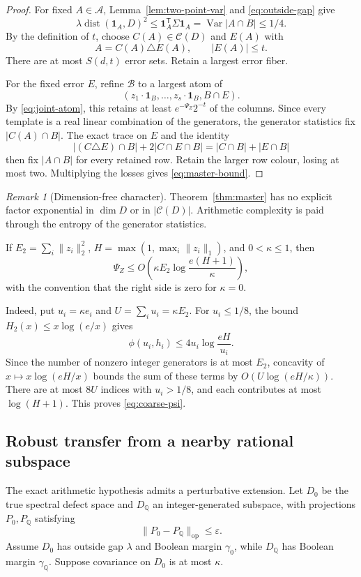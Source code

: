 \documentclass[11pt]{article}
\theoremstyle{definition}
\theoremstyle{remark}
\newtheorem{remark}[theorem]{Remark}
\newcommand{\cA}{\mathcal A}
\newcommand{\cB}{\mathcal B}
\newcommand{\cC}{\mathcal C}
\newcommand{\1}{\mathbf 1}
\newcommand{\Var}{\operatorname{Var}}
\newcommand{\dist}{\operatorname{dist}}
\begin{document}
\begin{proof}
For fixed $A\in\cA$, Lemma~\ref{lem:two-point-var} and
\eqref{eq:outside-gap} give
\[
 \lambda\dist(\1_A,D)^2
 \le\1_A^\mathsf T\Sigma\1_A
 =\Var|A\cap B|
 \le1/4.
\]
By the definition of $t$, choose $C(A)\in\cC(D)$ and $E(A)$ with
\[
 A=C(A)\triangle E(A),
 \qquad |E(A)|\le t.
\]
There are at most $S(d,t)$ error sets.  Retain a largest error fiber.

For the fixed error $E$, refine $\cB$ to a largest atom of
\[
 (z_1\cdot\1_B,\ldots,z_s\cdot\1_B, B\cap E).
\]
By \eqref{eq:joint-atom}, this retains at least
$e^{-\Psi_Z}2^{-t}$ of the columns.  Since every template is a real linear
combination of the generators, the generator statistics fix
$|C(A)\cap B|$.  The exact trace on $E$ and the identity
\[
 |(C\triangle E)\cap B|+2|C\cap E\cap B|
 =|C\cap B|+|E\cap B|
\]
then fix $|A\cap B|$ for every retained row.  Retain the larger row colour,
losing at most two.  Multiplying the losses gives
\eqref{eq:master-bound}.
\end{proof}

\begin{remark}[Dimension-free character]
Theorem~\ref{thm:master} has no explicit factor exponential in $\dim D$ or in
$|\cC(D)|$.  Arithmetic complexity is paid through the entropy of the
generator statistics.
\end{remark}

If $E_2=\sum_i\|z_i\|_2^2$,
$H=\max(1,\max_i\|z_i\|_1)$, and $0<\kappa\le1$, then
\begin{equation}\label{eq:coarse-psi}
 \Psi_Z\le
 O\left(\kappa E_2\log\frac{e(H+1)}{\kappa}\right),
\end{equation}
with the convention that the right side is zero for $\kappa=0$.

Indeed, put $u_i=\kappa e_i$ and $U=\sum_i u_i=\kappa E_2$.
For $u_i\le1/8$, the bound
$H_2(x)\le x\log(e/x)$ gives
\[
 \phi(u_i,h_i)\le4u_i\log\frac{eH}{u_i}.
\]
Since the number of nonzero integer generators is at most $E_2$, concavity
of $x\mapsto x\log(eH/x)$ bounds the sum of these terms by
$O(U\log(eH/\kappa))$.  There are at most $8U$ indices with
$u_i>1/8$, and each contributes at most $\log(H+1)$.  This proves
\eqref{eq:coarse-psi}.

\subsection{Robust transfer from a nearby rational subspace}

The exact arithmetic hypothesis admits a perturbative extension.  Let
$D_0$ be the true spectral defect space and $D_\mathbb Q$ an
integer-generated subspace, with projections $P_0,P_\mathbb Q$ satisfying
\begin{equation}\label{eq:projector-close}
 \|P_0-P_\mathbb Q\|_{\mathrm{op}}\le\varepsilon.
\end{equation}
Assume $D_0$ has outside gap $\lambda$ and Boolean margin $\gamma_0$, while
$D_\mathbb Q$ has Boolean margin $\gamma_\mathbb Q$.  Suppose covariance on
$D_0$ is at most $\kappa$.
\end{document}
